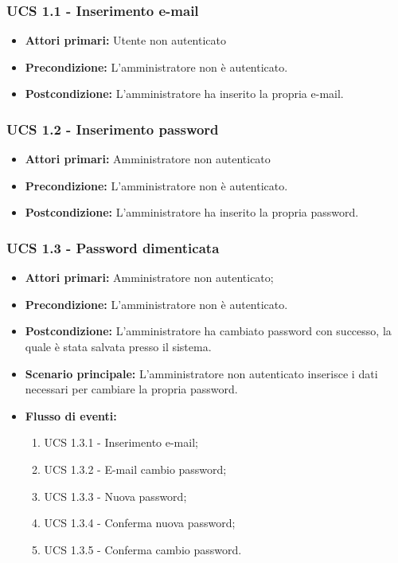 \subsubsection{UCS 1.1 - Inserimento e-mail}%
\begin{itemize}
\item \textbf{Attori primari:} Utente non autenticato
\item \textbf{Precondizione:} L'amministratore non è autenticato.
\item \textbf{Postcondizione:} L'amministratore ha inserito la propria e-mail.
\end{itemize}

\subsubsection{UCS 1.2 - Inserimento password}%
\begin{itemize}
\item \textbf{Attori primari:} Amministratore non autenticato
\item \textbf{Precondizione:} L'amministratore non è autenticato.
\item \textbf{Postcondizione:} L'amministratore ha inserito la propria password.
\end{itemize}

\subsubsection{UCS 1.3 - Password dimenticata}%
\begin{itemize}
\item \textbf{Attori primari:} Amministratore non autenticato;
\item \textbf{Precondizione:}  L'amministratore non è autenticato.
\item \textbf{Postcondizione:} L'amministratore ha cambiato password con successo, la quale è stata salvata presso il sistema.
\item \textbf{Scenario principale:} L'amministratore non autenticato inserisce i dati necessari per cambiare la propria password.
\item \textbf{Flusso di eventi:}
    \begin{enumerate}
        \item UCS 1.3.1 - Inserimento e-mail;
        \item UCS 1.3.2 - E-mail cambio password;
        \item UCS 1.3.3 - Nuova password;
        \item UCS 1.3.4 - Conferma nuova password;
        \item UCS 1.3.5 - Conferma cambio password.
    \end{enumerate}
\end{itemize}

